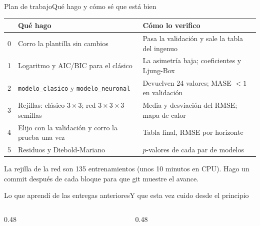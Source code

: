 \documentclass[aspectratio=169,10pt]{beamer}
\begin{document}
\begin{frame}{Plan de trabajo}{Qué hago y cómo sé que está bien}
  \small
  \begin{tabular}{@{}p{0.3cm}p{5.0cm}p{5.9cm}@{}}
    \toprule
    & \textbf{Qué hago} & \textbf{Cómo lo verifico} \\
    \midrule
    0 & Corro la plantilla sin cambios & Pasa la validación y sale la tabla del ingenuo \\
    1 & Logaritmo y AIC/BIC para el clásico & La asimetría baja; coeficientes y Ljung-Box \\
    2 & \texttt{modelo\_clasico} y \texttt{modelo\_neuronal} & Devuelven 24 valores; MASE $< 1$ en validación \\
    3 & Rejillas: clásico $3 \times 3$; red $3 \times 3 \times 3$ semillas & Media y desviación del RMSE; mapa de calor \\
    4 & Elijo con la validación y corro la prueba una vez & Tabla final, RMSE por horizonte \\
    5 & Residuos y Diebold-Mariano & $p$-valores de cada par de modelos \\
    \bottomrule
  \end{tabular}
  \vspace{0.2cm}

  {\footnotesize\color{UDSilver} La rejilla de la red son 135 entrenamientos (unos 10 minutos en CPU). Hago un commit después de cada bloque para que git muestre el avance.}
\end{frame}

\begin{frame}{Lo que aprendí de las entregas anteriores}{Y que esta vez cuido desde el principio}
  \begin{columns}[T,onlytextwidth]
    \begin{column}{0.48\textwidth}
      \vspace{0.15cm}
    \end{column}
    \begin{column}{0.48\textwidth}
      \vspace{0.15cm}
    \end{column}
  \end{columns}
\end{frame}
\end{document}
